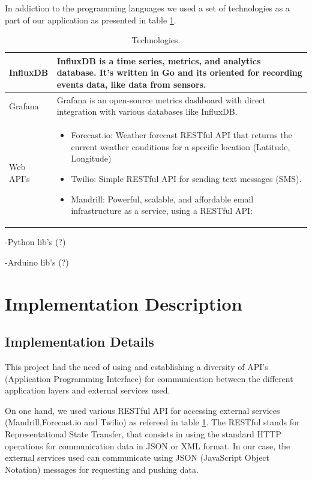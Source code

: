 \documentclass[12pt]{report}
\begin{document}
In addiction to the programming languages we used a set of technologies as a part of our application as presented in table \ref{tab:tech}.

\begin{table}[H]
\begin{tabularx}{\textwidth}{ |l|X| }
  	\hline
  	InfluxDB & InfluxDB\cite{influx} is a time series, metrics, and analytics database. It’s written in Go and its oriented for recording events data, like data from sensors.\\
 	\hline
 	Grafana & Grafana\cite{grafana} is an open-source metrics dashboard with direct integration with various databases like InfluxDB.\\
  	\hline
 	Web API's &\begin{itemize}
 	\item Forecast.io: Weather forecast RESTful API that returns the current weather conditions for a specific location (Latitude, Longitude)
 	\item Twilio: Simple RESTful API for sending text messages (SMS).
 	\item Mandrill: Powerful, scalable, and affordable email infrastructure as a service, using a RESTful API: 
 	\end{itemize}   \\
	\hline
\end{tabularx}
	\caption{Technologies.}
  	\label{tab:tech}
\end{table}

-Python lib's (?)

-Arduino lib's (?)

\section{Implementation Description}

\subsection{Implementation Details}

This project had the need of using and establishing a diversity of API's (Application Programming Interface) for communication between the different application layers and external services used.

On one hand, we used various RESTful API for accessing external services (Mandrill\cite{mandrillapi},Forecast.io\cite{fcapi} and Twilio\cite{twilioapi}) as refereed in table \ref{tab:tech}. The RESTful stands for Representational State Transfer, that consists in using the standard HTTP operations for communication data in JSON or XML format. In our case, the external services used can communicate using JSON (JavaScript Object Notation) messages for requesting and pushing data.
\end{document}
